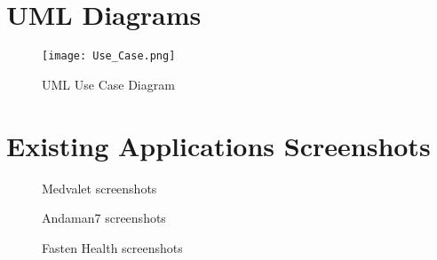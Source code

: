 \appendix

\chapter{UML Diagrams}

\begin{figure}[ht]
    \centering
    \texttt{[image: Use\_Case.png]}
    \caption{UML Use Case Diagram}
    \label{fig:uml_usecase}
\end{figure}

\chapter{Existing Applications Screenshots}

\begin{figure}[h!]
    \centering
     \quad
    \caption{Medvalet screenshots}
    \label{fig:medvalet}
\end{figure}

\begin{figure}[ht]
    \centering
     \quad
    \caption{Andaman7 screenshots}
    \label{fig:andaman7}
\end{figure}

\begin{figure}[ht]
    \centering
    \hspace{0.05\textwidth} 
    \caption{Fasten Health screenshots}
    \label{fig:fasten}
\end{figure}
